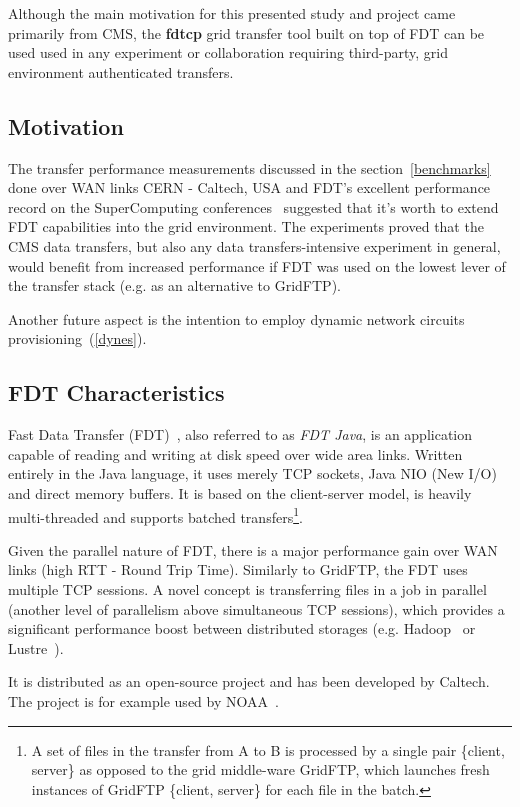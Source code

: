 \documentclass[a4paper]{jpconf}
\begin{document}
Although the main motivation for this presented study and project came
primarily from CMS, the {\bf fdtcp} grid transfer tool built on top of FDT
can be used used in any experiment or collaboration requiring third-party,
grid environment authenticated transfers.


\subsection{Motivation}
The transfer performance measurements discussed in the
section~\ref{benchmarks} done over WAN
links CERN - Caltech, USA and FDT's excellent performance record
on the SuperComputing conferences~\cite{fdtsc09} suggested that it's
worth to
extend FDT capabilities into the grid environment.
The experiments proved that the CMS data transfers, but also any data
transfers-intensive experiment in general, would benefit from increased
performance if FDT was used on the lowest lever of the transfer
stack (e.g. as an alternative to GridFTP).

Another future aspect is the intention to employ dynamic network circuits
provisioning~(\ref{dynes}). 


\subsection{FDT Characteristics} %
Fast Data Transfer (FDT)~\cite{fdt}, also referred to as \emph{FDT Java},
is an application capable of reading and
writing at disk speed over wide area links. Written entirely in the Java
language, it uses merely TCP sockets, Java NIO (New
I/O) and direct memory buffers. It is based on the client-server model, is
heavily multi-threaded and supports batched
transfers\footnote{A set of files in the transfer from A to B is processed
by a single pair \{client, server\} as opposed to the grid middle-ware
GridFTP, which launches fresh instances of GridFTP \{client, server\} for
each file in the batch.}. 

Given the parallel nature of FDT, there is a major performance gain over WAN
links (high RTT - Round Trip Time). Similarly to GridFTP, the FDT uses
multiple TCP sessions. A novel concept is transferring
files in a job in parallel (another level of parallelism above
simultaneous TCP sessions), which provides a significant performance boost
between distributed storages (e.g. Hadoop~\cite{hdfs} or
Lustre~\cite{lustre}).

It is distributed as an open-source project and has been developed by
Caltech. The project is for example used by NOAA~\cite{noaa}.
\end{document}
